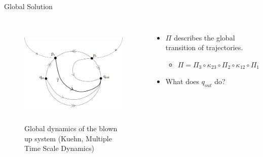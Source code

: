\documentclass[11pt]{beamer}
\begin{document}
\begin{frame}{Global Solution}
\begin{columns}
\begin{figure}
    
    \includegraphics[height=5cm,width=7cm]{Blow_up_fold.png}
    \caption{Global dynamics of the blown up system (Kuehn, Multiple Time Scale Dynamics)}

\end{figure}
\begin{itemize}
\item $\Pi$ describes the global transition of trajectories.
\begin{itemize}
    \item $\Pi=\Pi_3\circ\kappa_{23}\circ\Pi_2\circ\kappa_{12}\circ\Pi_1$
\end{itemize}
\item What does $q_{out}$ do?
\end{itemize}
\end{columns}
\end{frame}
\end{document}
